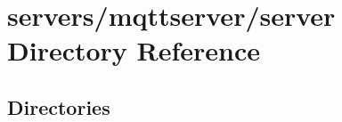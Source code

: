 \section{servers/mqttserver/server Directory Reference}
\label{dir_09b7542e9e33d3a08210a53c85f48edc}
\subsection*{Directories}
\begin{DoxyCompactItemize}
\end{DoxyCompactItemize}
